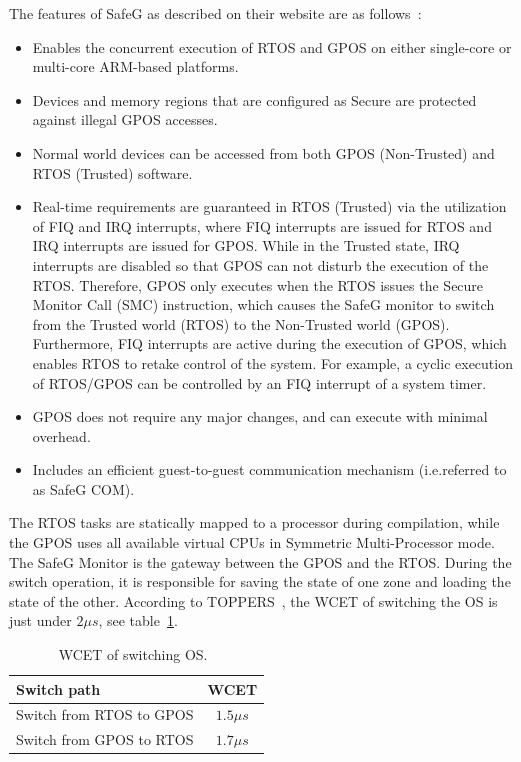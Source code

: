 The features of SafeG as described on their website are as follows~\cite{website:safeg}:

\begin{itemize}
\item Enables the concurrent execution of RTOS and GPOS on either single-core or multi-core ARM-based platforms.

\item Devices and memory regions that are configured as Secure are protected against illegal GPOS accesses.

\item Normal world devices can be accessed from both GPOS (Non-Trusted) and RTOS (Trusted) software.

\item Real-time requirements are guaranteed in RTOS (Trusted) via the utilization of FIQ and IRQ interrupts, where FIQ interrupts are issued for RTOS and IRQ interrupts are issued for GPOS. While in the Trusted state, IRQ interrupts are disabled so that GPOS can not disturb the execution of the RTOS. Therefore, GPOS only executes when the RTOS issues the Secure Monitor Call (SMC) instruction, which causes the SafeG monitor to switch from the Trusted world (RTOS) to the Non-Trusted world (GPOS). Furthermore, FIQ interrupts are active during the execution of GPOS, which enables RTOS to retake control of the system. For example, a cyclic execution of RTOS/GPOS can be controlled by an FIQ interrupt of a system timer.

\item GPOS does not require any major changes, and can execute with minimal overhead.

\item Includes an efficient guest-to-guest communication mechanism (i.e.referred to as SafeG COM).
\end{itemize}

The RTOS tasks are statically mapped to a processor during compilation, while the GPOS uses all available virtual CPUs in Symmetric Multi-Processor mode.\\

The SafeG Monitor is the gateway between the GPOS and the RTOS. During the switch operation, it is responsible for saving the state of one zone and loading the state of the other. According to TOPPERS~\cite{safegswitch}, the WCET of switching the OS is just under $2 \mu s$, see table~\ref{table:safegswitch}.

\begin{table}[H]
\centering
\begin{tabular}{|l|c|}
\hline
Switch path & WCET\\ \hline
Switch from RTOS to GPOS & $1.5 \mu s$\\ \hline
Switch from GPOS to RTOS & $1.7 \mu s$\\ \hline
\end{tabular}
\caption{WCET of switching OS.~\cite{safegswitch}}
\label{table:safegswitch}
\end{table}

